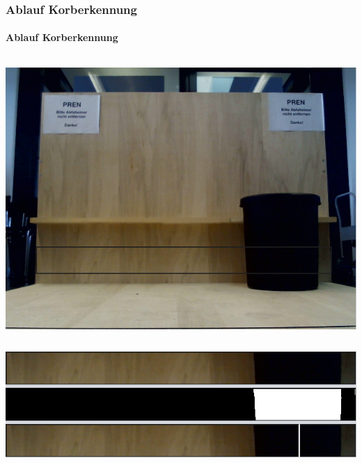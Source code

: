 \begin{frame}
    \frametitle{Ablauf Korberkennung}
    \framesubtitle{Ablauf Korberkennung}
    \begin{columns}
            \includegraphics[width=1.0\textwidth]{../doc/fig/BildMitKorb_markiert.png}
     \end{columns}
     \begin{columns}
            \centering
            \includegraphics[width=1\textwidth]{../doc/fig/Korberkennung_Schritte.png}
    \end{columns}
\end{frame}

